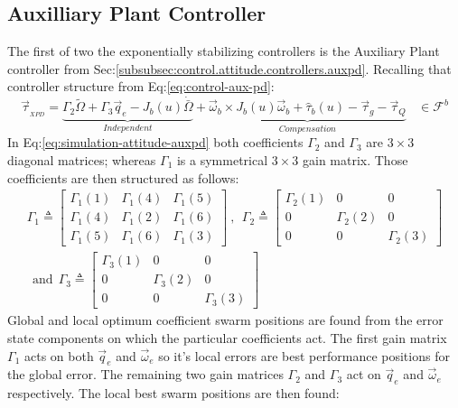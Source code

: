 \subsection{Auxilliary Plant Controller}
\label{subsec:simulation.attitude.xpd}
The first of two the exponentially stabilizing controllers is the Auxiliary Plant controller from Sec:\ref{subsubsec:control.attitude.controllers.auxpd}. Recalling that controller structure from Eq:\ref{eq:control-aux-pd}:
\begin{equation}\label{eq:simulation-attitude-auxpd}
\vec{\tau}_{_{XPD}}=\underbrace{\Gamma_2{\widetilde{\Omega}}+\Gamma_3\vec{q}_e-J_b(u)\dot{\bar{\Omega}}}_{Independent}+\underbrace{\vec{\omega}_b\times J_b(u)\vec{\omega}_b+\hat{\tau}_b(u)-\vec{\tau}_g-\vec{\tau}_Q}_{Compensation}~~~~\in\mathcal{F}^{b}
\end{equation}
In Eq:\ref{eq:simulation-attitude-auxpd} both coefficients $\Gamma_2$ and $\Gamma_3$ are $3\times 3$ diagonal matrices; whereas $\Gamma_1$ is a symmetrical $3\times 3$ gain matrix. Those coefficients are then structured as follows:
\begin{multline}\label{eq:simulation-attitde-auxpd-coefficients}
\Gamma_1\triangleq \begin{bmatrix}
\Gamma_1(1) & \Gamma_1(4) & \Gamma_1(5)\\
\Gamma_1(4) & \Gamma_1(2) & \Gamma_1(6)\\
\Gamma_1(5) & \Gamma_1(6) & \Gamma_1(3)
\end{bmatrix}~,~~
\Gamma_2\triangleq \begin{bmatrix}
\Gamma_2(1) & 0 & 0\\
0 &\Gamma_2(2) & 0\\
0 & 0 & \Gamma_2(3)
\end{bmatrix}
\\
~~\text{and}~~\Gamma_3\triangleq \begin{bmatrix}
\Gamma_3(1) & 0 & 0\\
0 & \Gamma_3(2) & 0\\
0 & 0 & \Gamma_3(3)
\end{bmatrix}
\end{multline}
Global and local optimum coefficient swarm positions are found from the error state components on which the particular coefficients act. The first gain matrix $\Gamma_1$ acts on both $\vec{q}_e$ and $\vec{\omega}_e$ so it's local errors are best performance positions for the global error. The remaining two gain matrices $\Gamma_2$ and $\Gamma_3$ act on $\vec{q}_e$ and $\vec{\omega}_e$ respectively. The local best swarm positions are then found:
